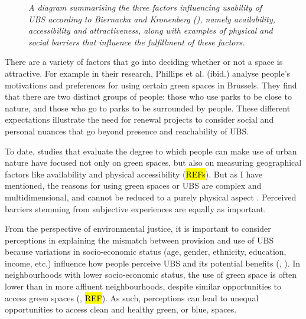 \documentclass{article}
\begin{document}
\begin{figure}[ht]
	\caption{\textit{A diagram summarising the three factors influencing usability of UBS according to Biernacka and Kronenberg (\citeyear{biernacka2018classification}), namely availability, accessibility and attractiveness, along with examples of physical and social barriers that influence the fulfillment of these factors.}}
	  \label{fig:diagram_ubs_use}
\end{figure}

There are a variety of factors that go into deciding whether or not a space is attractive. For example in their research, Phillips et al. (ibid.) analyse people's motivations and preferences for using certain green spaces in Brussels. They find that there are two distinct groups of people: those who use parks to be close to nature, and those who go to parks to be surrounded by people.
These different expectations illustrate the need for renewal projects to consider social and personal nuances that go beyond presence and reachability of UBS.

To date, studies that evaluate the degree to which people can make use of urban nature have focused not only on green spaces, but also on measuring geographical factors like availability and physical accessibility (\hl{REFs}).
But as I have mentioned, the reasons for using green spaces or UBS are complex and multidimensional, and cannot be reduced to a purely physical aspect \parencite{wang2015physical}. Perceived barriers stemming from subjective experiences are equally as important.

From the perspective of environmental justice, it is important to consider perceptions in explaining the mismatch between provision and use of UBS because variations in socio-economic status (age, gender, ethnicity, education, income, etc.) influence how people perceive UBS and its potential benefits (\cite{plieninger2022disentangling}, \cite{phillips2021use}). In neighbourhoods with lower socio-economic status, the use of green space is often lower than in more affluent neighbourhoods, despite similar opportunities to access green spaces (\cite{wang2015comparison}, \hl{REF}). As such, perceptions can lead to unequal opportunities to access clean and healthy green, or blue, spaces.
\end{document}
